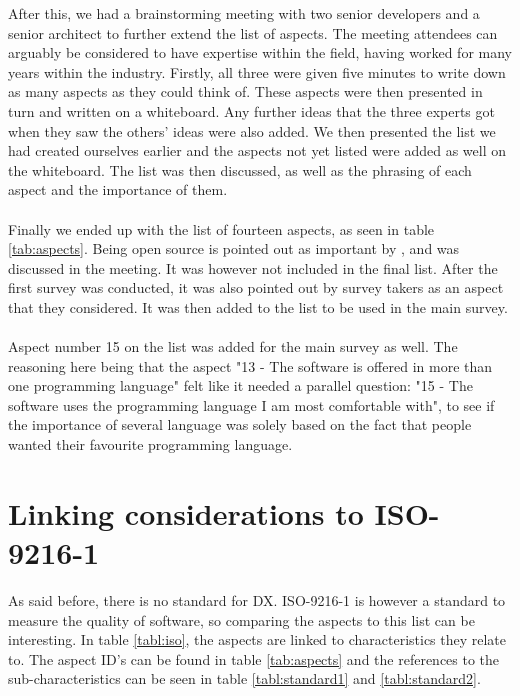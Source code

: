 \documentclass{cslthse-msc}
\begin{document}
    After this, we had a brainstorming meeting with two senior developers and a
    senior architect to further extend the list of aspects. The meeting attendees can arguably be considered
    to have expertise within the field, having worked for many years within the industry.
    Firstly, all three
    were given five minutes to write down as many aspects as they could think of.
    These aspects were then presented in turn and written on a whiteboard. Any further ideas
    that the three experts got when they saw the others' ideas were also added.
    We then presented the list we had created ourselves earlier and the aspects not yet listed were added
    as well on the whiteboard. The list was then discussed, as well as the phrasing of each aspect and the importance
    of them.
    \\ \\
    Finally we ended up with the list of fourteen aspects, as seen in table \ref{tab:aspects}.
    Being open source is pointed out as important by \citet{jarman}, and was discussed in the meeting.
    It was however not included in the final list. After the first survey was conducted, it was
    also pointed out by survey takers as an aspect that they considered. It was then
    added to the list to be used in the main survey.
    \\ \\
    Aspect number 15 on the list was
    added for the main survey as well. The reasoning here being that the aspect
    "13 - The software is offered in more than one programming language" felt
    like it needed a parallel question: "15 - The software uses the programming language I am most comfortable with",
    to see if the importance of several language was solely based on the fact that
    people wanted their favourite programming language.


    \section{Linking considerations to ISO-9216-1}

    As said before, there is no standard for DX. ISO-9216-1 is however a standard
    to measure the quality of software, so comparing the aspects to this list can
    be interesting. In table \ref{tabl:iso}, the aspects are linked to characteristics they relate to. The aspect ID's can
    be found in table \ref{tab:aspects} and the references to the sub-characteristics can be seen in table \ref{tabl:standard1} and \ref{tabl:standard2}.
\end{document}
